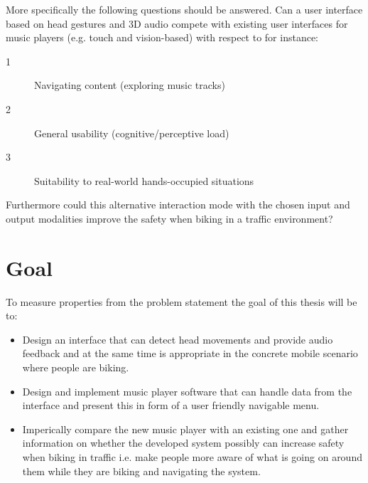 More specifically the following questions should be answered. Can a user interface based on head gestures and 3D audio compete with existing user interfaces for music players (e.g. touch and vision-based) with respect to for instance:
\begin{description}
\item[1] Navigating content (exploring music tracks)
\item[2] General usability (cognitive/perceptive load)
\item[3] Suitability to real-world hands-occupied situations
\end{description}
Furthermore could this alternative interaction mode with the chosen input and output modalities improve the safety when biking in a traffic environment?



\section{Goal}
To measure properties from the problem statement the goal of this thesis will be to:
\begin{itemize}
\item Design an interface that can detect head movements and provide audio feedback and at the same time is appropriate in the concrete mobile scenario where people are biking.
\item Design and implement music player software that can handle data from the interface and present this in form of a user friendly navigable menu.
\item Imperically compare the new music player with an existing one and gather information on whether the developed system possibly can increase safety when biking in traffic i.e. make people more aware of what is going on around them while they are biking and navigating the system.
\end{itemize}

